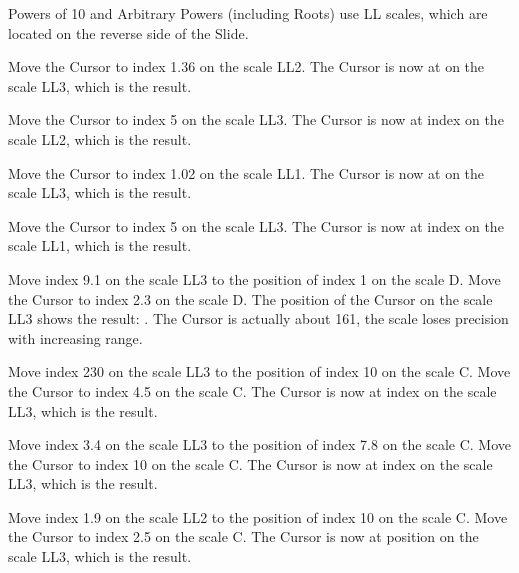 \begin{multicols*}{3}
{  

\footnotesize Powers of 10 and Arbitrary Powers (including Roots) use LL scales, which are located on the reverse side of the Slide. \normalsize

Move the Cursor to index 1.36 on the scale LL2.
The Cursor is now at  on the scale LL3, which is the result.


Move the Cursor to index 5 on the scale LL3.
The Cursor is now at index  on the scale LL2, which is the result.


Move the Cursor to index 1.02 on the scale LL1.
The Cursor is now at  on the scale LL3, which is the result.


Move the Cursor to index 5 on the scale LL3.
The Cursor is now at index  on the scale LL1, which is the result.


Move index 9.1 on the scale LL3 to the position of index 1 on the scale D.
Move the Cursor to index 2.3 on the scale D.
The position of the Cursor on the scale LL3 shows the result: . The Cursor is actually about 161, the scale loses precision with increasing range. 

Move index 230 on the scale LL3 to the position of index 10 on the scale C.
Move the Cursor to index 4.5 on the scale C.
The Cursor is now at index  on the scale LL3, which is the result.

Move index 3.4 on the scale LL3 to the position of index 7.8 on the scale C.
Move the Cursor to index 10 on the scale C.
The Cursor is now at index  on the scale LL3, which is the result.

Move index 1.9 on the scale LL2 to the position of index 10 on the scale C.
Move the Cursor to index 2.5 on the scale C.
The Cursor is now at position  on the scale LL3, which is the result.

}
\end{multicols*}
